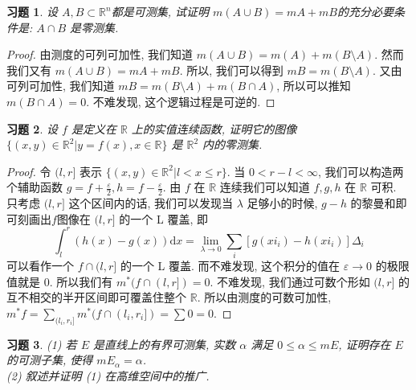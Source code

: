 \documentclass{article}
\newtheorem{exercise}{习题}
\begin{document}
\begin{exercise}
  设 $A, B \subset \mathbb{R}^n$都是可测集, 试证明 $m(A\cup B) = mA + mB$的充分必要条件是: $A\cap B$ 是零测集.
\end{exercise}
\begin{proof}
  由测度的可列可加性, 我们知道 $m(A\cup B) = m(A) + m(B\setminus A)$.
  然而我们又有 $m(A\cup B) = mA + mB$. 所以, 我们可以得到 $mB = m(B\setminus A)$.
  又由可列可加性, 我们知道 $mB = m(B\setminus A) + m(B\cap A)$, 所以可以推知 $m(B\cap A) = 0$. 不难发现, 这个逻辑过程是可逆的.
\end{proof}
\begin{exercise}
  设 $f$ 是定义在 $\mathbb{R}$ 上的实值连续函数, 证明它的图像 $\{(x, y)\in \mathbb{R}^2 | y = f(x), x\in \mathbb{R}\}$ 是 $\mathbb{R}^2$ 内的零测集.
\end{exercise}
\begin{proof}
  令 $(l, r]$ 表示 $\{(x,y)\in\mathbb{R}^2| l < x \leq r\}$. 当 $0 < r - l < \infty$, 我们可以构造两个辅助函数 $g = f + \frac{\varepsilon}{2}, h = f - \frac{\varepsilon}{2}$.
  由 $f$ 在 $\mathbb{R}$ 连续我们可以知道 $f, g, h$ 在 $\mathbb{R}$ 可积. 只考虑 $(l, r]$ 这个区间内的话, 我们可以发现当 $\lambda$ 足够小的时候, $g - h$ 的黎曼和即可刻画出$f$图像在 $(l, r]$ 的一个 L 覆盖, 即
  \[\int_l^r (h(x) - g(x)) \mathrm{d}x = \lim_{\lambda \to 0}\sum_{i} [g(xi_i) - h(xi_i)]\Delta_i\]
  可以看作一个 $f \cap (l, r]$ 的一个 L 覆盖. 而不难发现, 这个积分的值在 $\varepsilon \to 0$ 的极限值就是 0. 所以我们有 $m^*(f \cap (l, r]) = 0$.
  不难发现, 我们通过可数个形如 $(l, r]$ 的互不相交的半开区间即可覆盖住整个 $\mathbb{R}$. 所以由测度的可数可加性, $m^*f = \sum_{(l_i, r_i]} m^*(f\cap (l_i, r_i]) = \sum 0 = 0$.
\end{proof}
\begin{exercise}
  (1) 若 $E$ 是直线上的有界可测集, 实数 $\alpha$ 满足 $0 \leq \alpha \leq mE$, 证明存在 $E$ 的可测子集, 使得 $mE_\alpha = \alpha$. \\
  (2) 叙述并证明 (1) 在高维空间中的推广.
\end{exercise}
\end{document}
